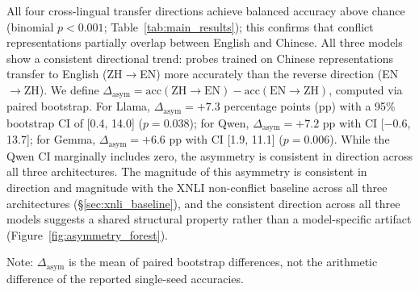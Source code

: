 All four cross-lingual transfer directions achieve balanced accuracy above chance (binomial $p < 0.001$; Table~\ref{tab:main_results}); this confirms that conflict representations partially overlap between English and Chinese.
All three models show a consistent directional trend: probes trained on Chinese representations transfer to English (ZH$\to$EN) more accurately than the reverse direction (EN$\to$ZH).
We define $\Delta_{\text{asym}} = \text{acc}(\text{ZH}{\to}\text{EN}) - \text{acc}(\text{EN}{\to}\text{ZH})$, computed via paired bootstrap.
For Llama, $\Delta_{\text{asym}} = +7.3$ percentage points (pp) with a 95\% bootstrap CI of [0.4, 14.0] ($p = 0.038$); for Qwen, $\Delta_{\text{asym}} = +7.2$ pp with CI [$-$0.6, 13.7]; for Gemma, $\Delta_{\text{asym}} = +6.6$ pp with CI [1.9, 11.1] ($p = 0.006$).
While the Qwen CI marginally includes zero, the asymmetry is consistent in direction across all three architectures.
The magnitude of this asymmetry is consistent in direction and magnitude with the XNLI non-conflict baseline across all three architectures (\S\ref{sec:xnli_baseline}), and the consistent direction across all three models suggests a shared structural property rather than a model-specific artifact (Figure~\ref{fig:asymmetry_forest}).

\begin{table}[t]
\centering
\caption{Single-seed balanced accuracy (\%) at each direction's optimal layer. $\Delta_{\text{asym}}$ and 95\% CIs from paired bootstrap ($n = 2{,}000$ resamples). Bold: best per-task direction.}
\label{tab:main_results}
\small
{}
\begin{flushleft}
\footnotesize Note: $\Delta_{\text{asym}}$ is the mean of paired bootstrap differences, not the arithmetic difference of the reported single-seed accuracies.
\end{flushleft}
\end{table}

